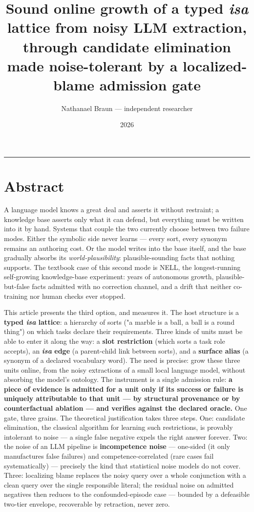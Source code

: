 \documentclass[11pt]{article}
\title{\textbf{Sound online growth of a typed \emph{isa} lattice from noisy LLM extraction, through candidate elimination made noise-tolerant by a localized-blame admission gate}}
\author{Nathanael Braun — independent researcher}
\date{2026}
\begin{document}
\maketitle
\medskip\hrule\medskip

\section*{Abstract}

A language model knows a great deal and asserts it without restraint; a knowledge base asserts only what it can defend, but everything must be written into it by hand. Systems that couple the two currently choose between two failure modes. Either the symbolic side never learns — every sort, every synonym remains an authoring cost. Or the model writes into the base itself, and the base gradually absorbs its \emph{world-plausibility}: plausible-sounding facts that nothing supports. The textbook case of this second mode is NELL, the longest-running self-growing knowledge-base experiment: years of autonomous growth, plausible-but-false facts admitted with no correction channel, and a drift that neither co-training nor human checks ever stopped.

This article presents the third option, and measures it. The host structure is a \textbf{typed \emph{isa} lattice}: a hierarchy of sorts ("a marble is a ball, a ball is a round thing") on which tasks declare their requirements. Three kinds of units must be able to enter it along the way: a \textbf{slot restriction} (which sorts a task role accepts), an \textbf{\emph{isa} edge} (a parent-child link between sorts), and a \textbf{surface alias} (a synonym of a declared vocabulary word). The need is precise: grow these three units online, from the noisy extractions of a small local language model, without absorbing the model's ontology. The instrument is a single admission rule: \textbf{a piece of evidence is admitted for a unit only if its success or failure is uniquely attributable to that unit — by structural provenance or by counterfactual ablation — and verifies against the declared oracle.} One gate, three grains. The theoretical justification takes three steps. One: candidate elimination, the classical algorithm for learning such restrictions, is provably intolerant to noise — a single false negative expels the right answer forever. Two: the noise of an LLM pipeline is \textbf{incompetence noise} — one-sided (it only manufactures false failures) and competence-correlated (rare cases fail systematically) — precisely the kind that statistical noise models do not cover. Three: localizing blame replaces the noisy query over a whole conjunction with a clean query over the single responsible literal; the residual noise on admitted negatives then reduces to the confounded-episode case — bounded by a defeasible two-tier envelope, recoverable by retraction, never zero.
\end{document}
